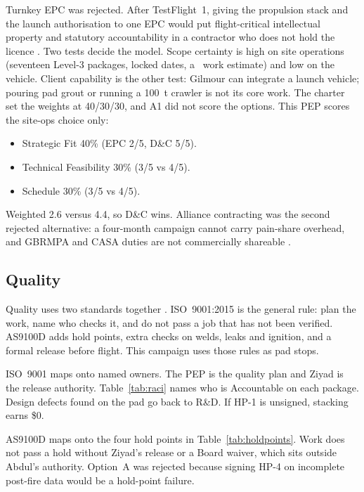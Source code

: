 Turnkey EPC was rejected. After TestFlight~1, giving the propulsion stack and the launch authorisation to one EPC would put flight-critical intellectual property and statutory accountability in a contractor who does not hold the licence \citep{gilmour2025,asa2025}. Two tests decide the model. Scope certainty is high on site operations (seventeen Level-3 packages, locked dates, a \PEPbase\ work estimate) and low on the vehicle. Client capability is the other test: Gilmour can integrate a launch vehicle; pouring pad grout or running a 100~t crawler is not its core work. The charter set the weights at 40/30/30, and A1 did not score the options. This PEP scores the site-ops choice only:
\begin{itemize}[leftmargin=1.4em,itemsep=0.25em]
\item Strategic Fit 40\% (EPC 2/5, D\&C 5/5).
\item Technical Feasibility 30\% (3/5 vs 4/5).
\item Schedule 30\% (3/5 vs 4/5).
\end{itemize}
Weighted 2.6 versus 4.4, so D\&C wins. Alliance contracting was the second rejected alternative: a four-month campaign cannot carry pain-share overhead, and GBRMPA and CASA duties are not commercially shareable \citep{gbrmpa2019,casa2024}.

\subsection{Quality}
\label{sec:delivery-quality}

Quality uses two standards together \citep{sae2016,iso9001}. ISO~9001:2015 is the general rule: plan the work, name who checks it, and do not pass a job that has not been verified. AS9100D adds hold points, extra checks on welds, leaks and ignition, and a formal release before flight. This campaign uses those rules as pad stops.

ISO~9001 maps onto named owners. The PEP is the quality plan and Ziyad is the release authority. Table~\ref{tab:raci} names who is Accountable on each package. Design defects found on the pad go back to R\&D. If HP-1 is unsigned, stacking earns \$0.

AS9100D maps onto the four hold points in Table~\ref{tab:holdpoints}. Work does not pass a hold without Ziyad's release or a Board waiver, which sits outside Abdul's authority. Option~A was rejected because signing HP-4 on incomplete post-fire data would be a hold-point failure.



